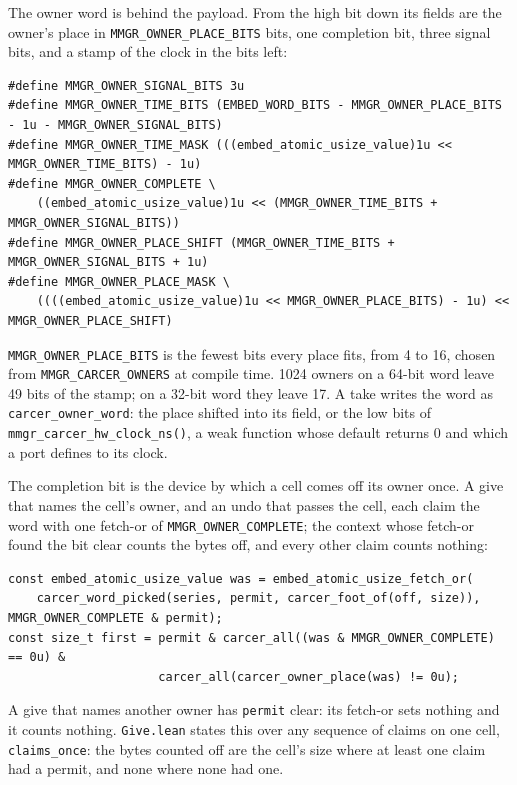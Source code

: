 The owner word is behind the payload. From the high bit down its fields are the owner's place in \texttt{MMGR\_\allowbreak{}OWNER\_\allowbreak{}PLACE\_\allowbreak{}BITS} bits, one completion bit, three signal bits, and a stamp of the clock in the bits left:

\begin{Verbatim}
#define MMGR_OWNER_SIGNAL_BITS 3u
#define MMGR_OWNER_TIME_BITS (EMBED_WORD_BITS - MMGR_OWNER_PLACE_BITS - 1u - MMGR_OWNER_SIGNAL_BITS)
#define MMGR_OWNER_TIME_MASK (((embed_atomic_usize_value)1u << MMGR_OWNER_TIME_BITS) - 1u)
#define MMGR_OWNER_COMPLETE \
    ((embed_atomic_usize_value)1u << (MMGR_OWNER_TIME_BITS + MMGR_OWNER_SIGNAL_BITS))
#define MMGR_OWNER_PLACE_SHIFT (MMGR_OWNER_TIME_BITS + MMGR_OWNER_SIGNAL_BITS + 1u)
#define MMGR_OWNER_PLACE_MASK \
    ((((embed_atomic_usize_value)1u << MMGR_OWNER_PLACE_BITS) - 1u) << MMGR_OWNER_PLACE_SHIFT)
\end{Verbatim}

\texttt{MMGR\_\allowbreak{}OWNER\_\allowbreak{}PLACE\_\allowbreak{}BITS} is the fewest bits every place fits, from 4 to 16, chosen from \texttt{MMGR\_\allowbreak{}CARCER\_\allowbreak{}OWNERS} at compile time. 1024 owners on a 64-bit word leave 49 bits of the stamp; on a 32-bit word they leave 17. A take writes the word as \texttt{carcer\_\allowbreak{}owner\_\allowbreak{}word}: the place shifted into its field, or the low bits of \texttt{mmgr\_\allowbreak{}carcer\_\allowbreak{}hw\_\allowbreak{}clock\_\allowbreak{}ns()}, a weak function whose default returns 0 and which a port defines to its clock.

The completion bit is the device by which a cell comes off its owner once. A give that names the cell's owner, and an undo that passes the cell, each claim the word with one fetch-or of \texttt{MMGR\_\allowbreak{}OWNER\_\allowbreak{}COMPLETE}; the context whose fetch-or found the bit clear counts the bytes off, and every other claim counts nothing:

\begin{Verbatim}
const embed_atomic_usize_value was = embed_atomic_usize_fetch_or(
    carcer_word_picked(series, permit, carcer_foot_of(off, size)), MMGR_OWNER_COMPLETE & permit);
const size_t first = permit & carcer_all((was & MMGR_OWNER_COMPLETE) == 0u) &
                     carcer_all(carcer_owner_place(was) != 0u);
\end{Verbatim}

A give that names another owner has \texttt{permit} clear: its fetch-or sets nothing and it counts nothing. \texttt{Give.\allowbreak{}lean} states this over any sequence of claims on one cell, \texttt{claims\_\allowbreak{}once}: the bytes counted off are the cell's size where at least one claim had a permit, and none where none had one.

